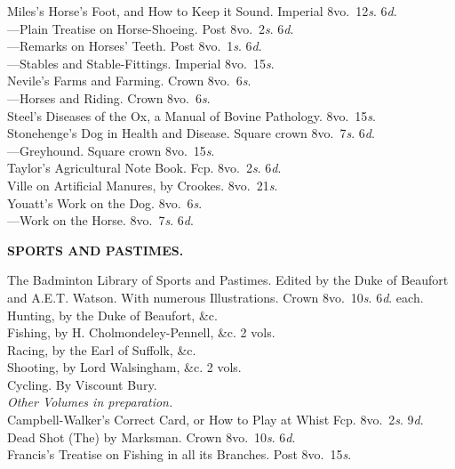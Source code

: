 \documentclass[letterpaper,12pt,oneside,openany]{memoir}
\newcommand{\D}{\hspace*{5mm}}
\newcommand{\E}{\hspace*{2mm}---\hspace*{2mm}}
\begin{document}
\begin{footnotesize}
Miles's Horse's Foot, and How to Keep it Sound. Imperial 8vo.\ 12\textit{s}. 6\textit{d}.\\
\E Plain Treatise on Horse-Shoeing. Post 8vo.\ 2\textit{s}. 6\textit{d}.\\
\E Remarks on Horses' Teeth. Post 8vo.\ 1\textit{s}. 6\textit{d}.\\
\E Stables and Stable-Fittings. Imperial 8vo.\ 15\textit{s}.\\
Nevile's Farms and Farming. Crown 8vo.\ 6\textit{s}.\\
\E Horses and Riding. Crown 8vo.\ 6\textit{s}.\\
Steel's Diseases of the Ox, a Manual of Bovine Pathology. 8vo.\ 15\textit{s}.\\
Stonehenge's Dog in Health and Disease. Square crown 8vo.\ 7\textit{s}. 6\textit{d}.\\
\E Greyhound. Square crown 8vo.\ 15\textit{s}.\\
Taylor's Agricultural Note Book. Fcp. 8vo.\ 2\textit{s}. 6\textit{d}.\\
Ville on Artificial Manures, by Crookes. 8vo.\ 21\textit{s}.\\
Youatt's Work on the Dog. 8vo.\ 6\textit{s}.\\
\E Work on the Horse. 8vo.\ 7\textit{s}. 6\textit{d}.
\begin{center}
\textbf{SPORTS AND PASTIMES.}
\end{center}
The Badminton Library of Sports and Pastimes. Edited by the Duke of Beaufort\\
\D and A.E.T. Watson. With numerous Illustrations. Crown 8vo.\ 10\textit{s}. 6\textit{d}. each.\\
\D Hunting, by the Duke of Beaufort, \&c.\\
\D Fishing, by H. Cholmondeley-Pennell, \&c. 2 vols.\\
\D Racing, by the Earl of Suffolk, \&c.\\
\D Shooting, by Lord Walsingham, \&c. 2 vols.\\
\D Cycling. By Viscount Bury.\\
\emph{Other Volumes in preparation.}\\[3mm]
Campbell-Walker's Correct Card, or How to Play at Whist Fcp. 8vo.\ 2\textit{s}. 9\textit{d}.\\
Dead Shot (The) by Marksman. Crown 8vo.\ 10\textit{s}. 6\textit{d}.\\
Francis's Treatise on Fishing in all its Branches. Post 8vo.\ 15\textit{s}.\\

\end{footnotesize}
\end{document}
